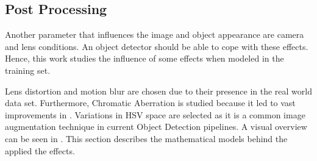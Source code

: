 \subsection{Post Processing}

Another parameter that influences the image and object appearance are camera and lens conditions. An object detector should be able to cope with these effects. Hence, this work studies the influence of some effects when modeled in the training set.

Lens distortion and motion blur are chosen due to their presence in the real world data set. Furthermore, Chromatic Aberration is studied because it led to vast improvements in \cite{Carlson2018}. Variations in \ac{HSV} space are selected as it is a common image augmentation technique in current Object Detection pipelines. A visual overview can be seen in . This section describes the mathematical models behind the applied the effects.

